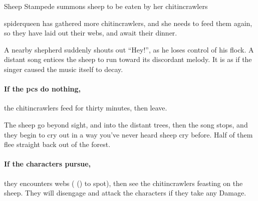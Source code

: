 \spiderqueen
\label{spiderqueen}



{Sheep Stampede}%
{ summons sheep to be eaten by her chitincrawlers}%

\begin{exampletext}
  \Gls{spiderqueen} has gathered more chitincrawlers, and she needs to feed them again, so they have laid out their webs, and await their dinner.
\end{exampletext}

\begin{boxtext}

  A nearby shepherd suddenly shouts out ``Hey!'', as he loses control of his flock.
  A distant song entices the sheep to run toward its discordant melody. It is as if the singer caused the music itself to decay.

\end{boxtext}

\paragraph{If the \glspl{pc} do nothing,}
the chitincrawlers feed for thirty minutes, then leave.

\begin{boxtext}

  The sheep go beyond sight, and into the distant trees, then the song stops, and they begin to cry out in a way you've never heard sheep cry before.  Half of them flee straight back out of the forest.

\end{boxtext}

\paragraph{If the characters pursue,}
they encounters webs ( (\tn[9]) to spot), then see the chitincrawlers feasting on the sheep.
They will disengage and attack the characters if they take any Damage.

